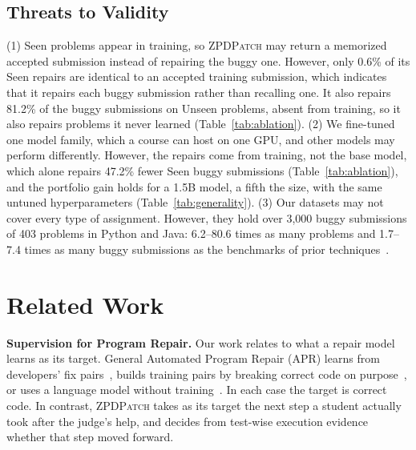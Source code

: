 \documentclass[10pt,conference]{IEEEtran}
\begin{document}
\subsection{Threats to Validity}
(1) Seen problems appear in training, so \textsc{ZPDPatch} may return a memorized accepted submission instead of repairing the buggy one. However, only 0.6\% of its Seen repairs are identical to an accepted training submission, which indicates that it repairs each buggy submission rather than recalling one. It also repairs 81.2\% of the buggy submissions on Unseen problems, absent from training, so it also repairs problems it never learned (Table~\ref{tab:ablation}). (2) We fine-tuned one model family, which a course can host on one GPU, and other models may perform differently. However, the repairs come from training, not the base model, which alone repairs 47.2\% fewer Seen buggy submissions (Table~\ref{tab:ablation}), and the portfolio gain holds for a 1.5B model, a fifth the size, with the same untuned hyperparameters (Table~\ref{tab:generality}). (3) Our datasets may not cover every type of assignment. However, they hold over 3,000 buggy submissions of 403 problems in Python and Java: 6.2--80.6 times as many problems and 1.7--7.4 times as many buggy submissions as the benchmarks of prior techniques~\cite{hu2019re,xie2024brafar,dai2026learner}.

\section{Related Work}
\label{sec:related}
\noindent\textbf{Supervision for Program Repair.} Our work relates to what a repair model learns as its target. General Automated Program Repair (APR) learns from developers' fix pairs~\cite{tufano2019empirical,lutellier2020coconut}, builds training pairs by breaking correct code on purpose~\cite{yasunaga2021break,ye2022selfapr}, or uses a language model without training~\cite{xia2022less,jiang2023impact}. In each case the target is correct code. In contrast, \textsc{ZPDPatch} takes as its target the next step a student actually took after the judge's help, and decides from test-wise execution evidence whether that step moved forward.
\end{document}
